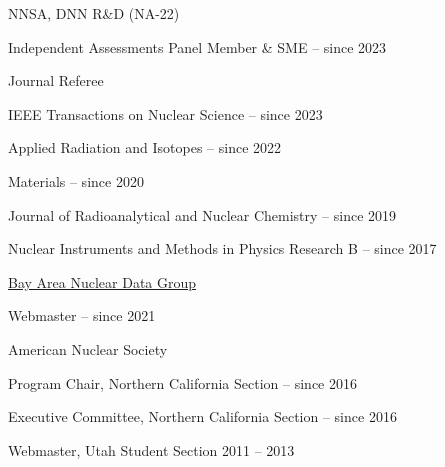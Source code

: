 \begin{list1}
\item[] NNSA, DNN R\&D (NA-22)
\begin{list2}
\item Independent Assessments Panel Member \& SME \hfill{ -- since 2023}
\end{list2}
\item[] Journal Referee
\begin{list2}
\item IEEE Transactions on Nuclear Science \hfill{ -- since 2023}
\item Applied Radiation and Isotopes \hfill{ -- since 2022}
\item Materials \hfill{ -- since 2020}
\item Journal of Radioanalytical and Nuclear Chemistry \hfill{ -- since 2019}
\item Nuclear Instruments and Methods in Physics Research B   \hfill{ -- since 2017}
\end{list2}
\item[] \href{https://nucleardata.berkeley.edu/}{Bay Area Nuclear Data Group}
\begin{list2}
\item Webmaster   \hfill{ -- since 2021}
\end{list2}
\item[] American Nuclear Society  
\begin{list2}
\item Program Chair, Northern California Section \hfill{ -- since 2016}
\item Executive Committee, Northern California Section \hfill{ -- since 2016}
\item Webmaster, Utah Student Section \hfill{2011 --  2013}
\end{list2}
\end{list1}
